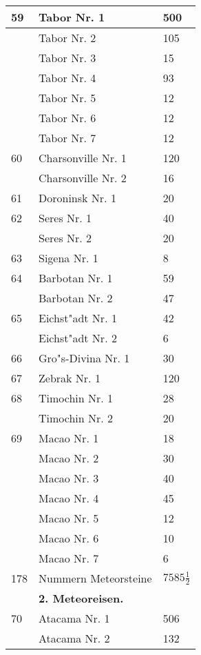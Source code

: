 \documentclass[a4paper, 11pt, oneside, polutonikogreek, german]{article}
\begin{document}
\begin{center}
\begin{longtable}{|l|l|l|}
        59 & Tabor Nr. 1 & 500 \\ \hline
          & Tabor Nr. 2 & 105 \\ \hline
          & Tabor Nr. 3 & 15 \\ \hline
          & Tabor Nr. 4 & 93 \\ \hline
          & Tabor Nr. 5 & 12 \\ \hline
          & Tabor Nr. 6 & 12 \\ \hline
          & Tabor Nr. 7 & 12 \\ \hline
        60 & Charsonville Nr. 1 & 120 \\ \hline
          & Charsonville Nr. 2 & 16 \\ \hline
        61 & Doroninsk Nr. 1 & 20 \\ \hline
        62 & Seres Nr. 1 & 40 \\ \hline
          & Seres Nr. 2 & 20 \\ \hline
        63 & Sigena Nr. 1 & 8 \\ \hline
        64 & Barbotan Nr. 1 & 59 \\ \hline
          & Barbotan Nr. 2 & 47 \\ \hline
        65 & Eichst"adt Nr. 1 & 42 \\ \hline
          & Eichst"adt Nr. 2 & 6 \\ \hline
        66 & Gro"s-Divina Nr. 1 & 30 \\ \hline
        67 & Zebrak Nr. 1 & 120 \\ \hline
        68 & Timochin Nr. 1 & 28 \\ \hline
          & Timochin Nr. 2 & 20 \\ \hline
        69 & Macao Nr. 1 & 18 \\ \hline
          & Macao Nr. 2 & 30 \\ \hline
          & Macao Nr. 3 & 40 \\ \hline
          & Macao Nr. 4 & 45 \\ \hline
          & Macao Nr. 5 & 12 \\ \hline
          & Macao Nr. 6 & 10 \\ \hline
          & Macao Nr. 7 & 6 \\ \hline
        178 & Nummern Meteorsteine & $7585\frac{1}{2}$ \\ \hline
          & \textbf{2. Meteoreisen.} &   \\ \hline
        70 & Atacama Nr. 1 & 506 \\ \hline
          & Atacama Nr. 2 & 132 \\ \hline

\end{longtable}
\end{center}
\end{document}
